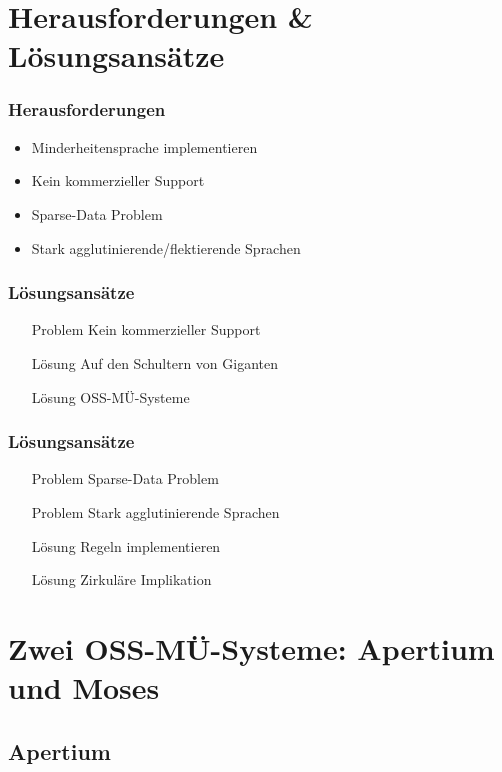 \documentclass{beamer}
\begin{document}
\section{Herausforderungen \& Lösungsansätze}
\begin{frame}
  \frametitle{Herausforderungen}
  \begin{itemize}
    \item Minderheitensprache implementieren
    \item Kein kommerzieller Support
    \item Sparse-Data Problem
    \item Stark agglutinierende/flektierende Sprachen
  \end{itemize}
\end{frame}
\begin{frame}
  \frametitle{Lösungsansätze}
  \begin{itemize}
    \item[Problem] Kein kommerzieller Support
    \item[Lösung] Auf den Schultern von Giganten
    \item[Lösung] OSS-MÜ-Systeme
  \end{itemize}
\end{frame}
\begin{frame}
  \frametitle{Lösungsansätze}
  \begin{itemize}
    \item[Problem] Sparse-Data Problem
    \item[Problem] Stark agglutinierende Sprachen
    \item[Lösung] Regeln implementieren
    \item[Lösung] Zirkuläre Implikation \cite{forcada}
  \end{itemize}
\end{frame}
\section{Zwei OSS-MÜ-Systeme: Apertium und Moses}
\subsection{Apertium}
\end{document}
